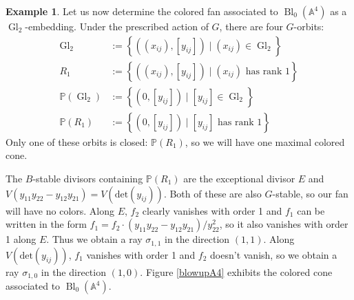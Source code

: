 \documentclass[12pt,twoside,cd]{amsart}
\theoremstyle{definition}
\newtheorem{example}[theorem]{Example}
\begin{document}
\begin{example}
Let us now determine the colored fan associated to ${\operatorname{Bl}}_0(\mathbb{A}^4)$ as a ${\operatorname{Gl}}_2$-embedding. Under the prescribed action of $G$, there are four $G$-orbits: 
\begin{align*}
{\operatorname{Gl}}_2 & := {\left\lbrace {((x_{ij}),[y_{ij}]) \mid (x_{ij}) \in {\operatorname{Gl}}_2} \right\rbrace} \\
R_1 & := {\left\lbrace {((x_{ij}),[y_{ij}]) \mid (x_{ij}) \text{ has  rank } 1} \right\rbrace} \\
\mathbb{P}({\operatorname{Gl}}_2) & :=  {\left\lbrace {(0,[y_{ij}]) \mid [y_{ij}] \in {\operatorname{Gl}}_2} \right\rbrace} \\
\mathbb{P}(R_1) & := {\left\lbrace {(0,[y_{ij}]) \mid [y_{ij}] \text{ has rank } 1} \right\rbrace}
\end{align*}
Only one of these orbits is closed: $\mathbb{P}(R_1)$, so we will have one maximal colored cone.

The $B$-stable divisors containing $\mathbb{P}(R_1)$ are the exceptional divisor $E$ and $V(y_{11}y_{22} - y_{12}y_{21}) = V(\text{det}(y_{ij}))$.
Both of these are also $G$-stable, so our fan will have no colors.
Along $E$, $f_2$ clearly vanishes with order 1 and $f_1$ can be written in the form $f_1 = f_2 \cdot (y_{11}y_{22} - y_{12}y_{21})/y_{22}^2$, so it also vanishes with order 1 along $E$. Thus we obtain a ray $\sigma_{1,1}$ in the direction $(1,1)$.
Along $V(\text{det}(y_{ij}))$, $f_1$ vanishes with order 1 and $f_2$ doesn't vanish, so we obtain a ray $\sigma_{1,0}$ in the direction $(1,0)$.
Figure \ref{blowupA4} exhibits the colored cone associated to ${\operatorname{Bl}}_0(\mathbb{A}^4)$.
\begin{figure}[!h]
\begin{floatrow}

\end{floatrow}
\end{figure}
\end{example}
\end{document}

